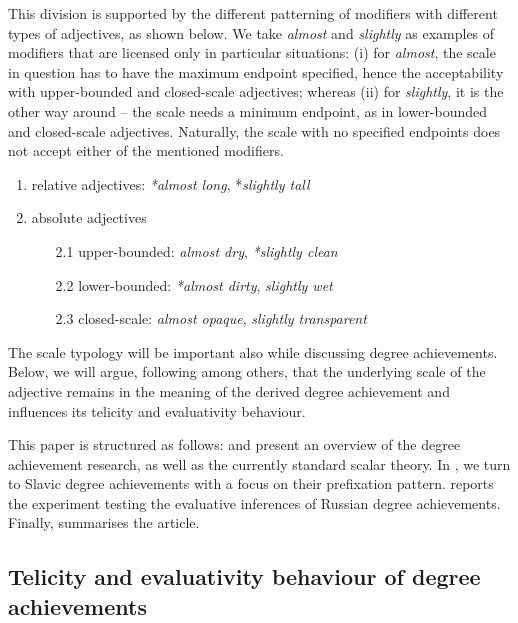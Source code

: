 \documentclass[output=paper]{langscibook}
\begin{document}
This division is supported by the different patterning of modifiers with different types of adjectives, as shown below. We take \textit{almost} and \textit{slightly} as examples of modifiers that are licensed only in particular situations: (i) for \textit{almost}, the scale in question has to have the maximum endpoint specified, hence the acceptability with upper-bounded and closed-scale adjectives; whereas (ii) for \textit{slightly}, it is the other way around -- the scale needs a minimum endpoint, as in lower-bounded and closed-scale adjectives. Naturally, the scale with no specified endpoints does not accept either of the mentioned modifiers.   

\begin{enumerate}
  \item relative adjectives: \textit{*almost long}, *\textit{slightly tall}
  \item absolute adjectives
  \begin{enumerate}
    \item[2.1] upper-bounded: \textit{almost dry}, \textit{*slightly clean}
    \item[2.2] lower-bounded: \textit{*almost dirty}, \textit{slightly wet}   
    \item[2.3] closed-scale: \textit{almost opaque}, \textit{slightly transparent}
  \end{enumerate}
\end{enumerate}

The scale typology will be important also while discussing degree achievements. Below, we will argue, following \citet{kennedy2008measure} among others, that the underlying scale of the adjective remains in the meaning of the derived degree achievement and influences its telicity and evaluativity behaviour.\largerpage

This paper is structured as follows:  and  present an overview of the degree achievement research, as well as the currently standard scalar theory. In , we turn to Slavic degree achievements with a focus on their prefixation pattern.  reports the experiment testing the evaluative inferences of Russian degree achievements. Finally,  summarises the article.

\subsection{Telicity and evaluativity behaviour of degree achievements}\label{DA:subsec:Telicity and evaluativity behaviour of degree achievements}\largerpage
\end{document}

